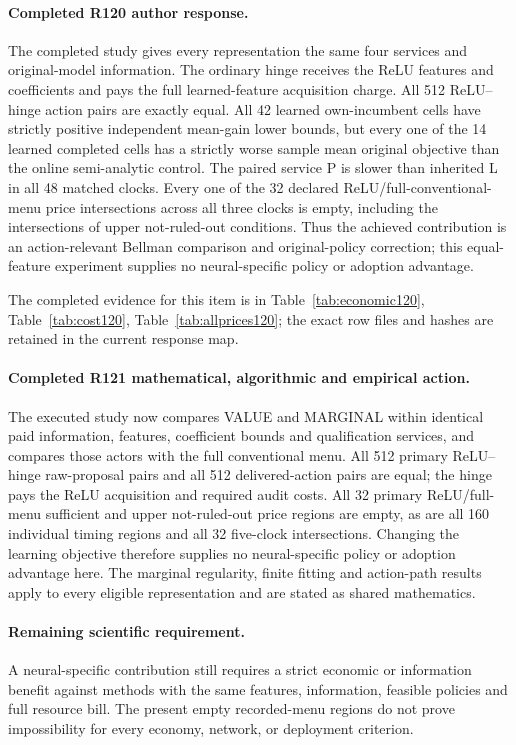 \paragraph{Completed R120 author response.}
The completed study gives every representation the same four services and original-model information. The ordinary hinge receives the ReLU features and coefficients and pays the full learned-feature acquisition charge. All 512 ReLU--hinge action pairs are exactly equal. All 42 learned own-incumbent cells have strictly positive independent mean-gain lower bounds, but every one of the 14 learned completed cells has a strictly worse sample mean original objective than the online semi-analytic control. The paired service P is slower than inherited L in all 48 matched clocks. Every one of the 32 declared ReLU/full-conventional-menu price intersections across all three clocks is empty, including the intersections of upper not-ruled-out conditions. Thus the achieved contribution is an action-relevant Bellman comparison and original-policy correction; this equal-feature experiment supplies no neural-specific policy or adoption advantage.

The completed evidence for this item is in Table~\ref{tab:economic120}, Table~\ref{tab:cost120}, Table~\ref{tab:allprices120}; the exact row files and hashes are retained in the current response map.

\paragraph{Completed R121 mathematical, algorithmic and empirical action.}
The executed study now compares VALUE and MARGINAL within identical paid information, features, coefficient bounds and qualification services, and compares those actors with the full conventional menu. All 512 primary ReLU--hinge raw-proposal pairs and all 512 delivered-action pairs are equal; the hinge pays the ReLU acquisition and required audit costs. All 32 primary ReLU/full-menu sufficient and upper not-ruled-out price regions are empty, as are all 160 individual timing regions and all 32 five-clock intersections. Changing the learning objective therefore supplies no neural-specific policy or adoption advantage here. The marginal regularity, finite fitting and action-path results apply to every eligible representation and are stated as shared mathematics.

\paragraph{Remaining scientific requirement.}
A neural-specific contribution still requires a strict economic or information benefit against methods with the same features, information, feasible policies and full resource bill. The present empty recorded-menu regions do not prove impossibility for every economy, network, or deployment criterion.

